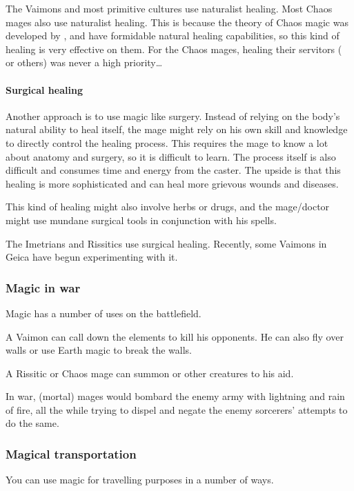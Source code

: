 The Vaimons and most primitive cultures use naturalist healing. Most Chaos mages also use naturalist healing. This is because the theory of Chaos magic was developed by \dragons{}, and \dragons{} have formidable natural healing capabilities, so this kind of healing is very effective on them. For the \draconic{} Chaos mages, healing their servitors (\scathae{} or others) was never a high priority\ldots{}





\paragraph{Surgical healing}
Another approach is to use magic like surgery. Instead of relying on the body's natural ability to heal itself, the mage might rely on his own skill and knowledge to directly control the healing process. This requires the mage to know a lot about anatomy and surgery, so it is difficult to learn. The process itself is also difficult and consumes time and energy from the caster. The upside is that this healing is more sophisticated and can heal more grievous wounds and diseases. 

This kind of healing might also involve herbs or drugs, and the mage/doctor might use mundane surgical tools in conjunction with his spells. 

The Imetrians and Rissitics use surgical healing. Recently, some Vaimons in Geica have begun experimenting with it. 





\subsubsection{Magic in war}
Magic has a number of uses on the battlefield. 

A Vaimon can call down the elements to kill his opponents. He can also fly over walls or use Earth magic to break the walls. 

A Rissitic or Chaos mage can summon  or other creatures to his aid. 

In war, (mortal) mages would bombard the enemy army with lightning and rain of fire, all the while trying to dispel and negate the enemy sorcerers' attempts to do the same. 





\subsubsection{Magical transportation}
You can use magic for travelling purposes in a number of ways. 



